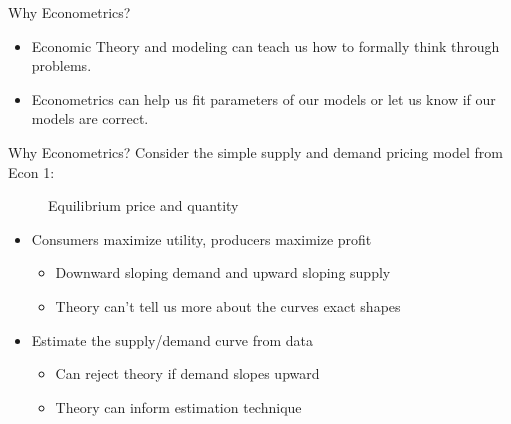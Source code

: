 \documentclass[notheorems,10pt]{beamer}
\begin{document}
\begin{frame}{Why Econometrics?} 
	\begin{itemize}
		\item Economic Theory and modeling can teach us how to formally think through problems.
		\item Econometrics can help us fit parameters of our models or let us know if our models are correct.
	\end{itemize}
\end{frame}
\begin{frame}{Why Econometrics?} 
	Consider the simple supply and demand pricing model from Econ 1:
	\begin{figure}[htpb]
		\centering
		\caption{Equilibrium price and quantity}%
	\end{figure}
	\begin{itemize}
		\item<1-3|only@1-3> Consumers maximize utility, producers maximize profit
		\begin{itemize}
			\item<2|only@2> Downward sloping demand and upward sloping supply
			\item<3|only@3> Theory can't tell us more about the curves exact shapes
		\end{itemize}
		\item<4-6|only@4-6> Estimate the supply/demand curve from data
		\begin{itemize}
			\item<5|only@5> Can reject theory if demand slopes upward
			\item<6|only@6> Theory can inform estimation technique
		\end{itemize}
	\end{itemize}
\end{frame}
\end{document}
